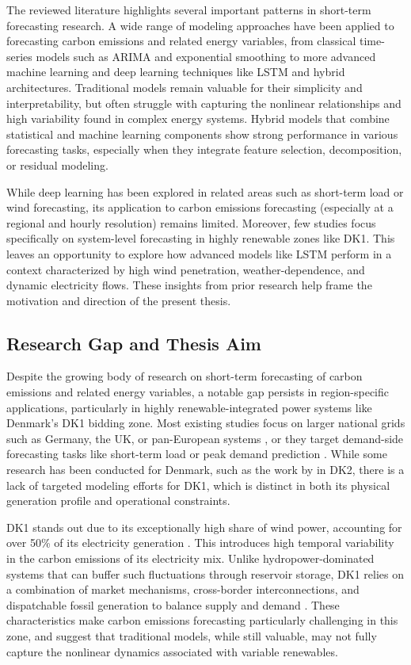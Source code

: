 The reviewed literature highlights several important patterns in short-term forecasting research. A wide range of modeling approaches have been applied to forecasting carbon emissions and related energy variables, from classical time-series models such as ARIMA and exponential smoothing to more advanced machine learning and deep learning techniques like LSTM and hybrid architectures. Traditional models remain valuable for their simplicity and interpretability, but often struggle with capturing the nonlinear relationships and high variability found in complex energy systems. Hybrid models that combine statistical and machine learning components show strong performance in various forecasting tasks, especially when they integrate feature selection, decomposition, or residual modeling.

While deep learning has been explored in related areas such as short-term load or wind forecasting, its application to carbon emissions forecasting (especially at a regional and hourly resolution) remains limited. Moreover, few studies focus specifically on system-level forecasting in highly renewable zones like DK1. This leaves an opportunity to explore how advanced models like LSTM perform in a context characterized by high wind penetration, weather-dependence, and dynamic electricity flows. These insights from prior research help frame the motivation and direction of the present thesis.

\subsection{Research Gap and Thesis Aim}

Despite the growing body of research on short-term forecasting of carbon emissions and related energy variables, a notable gap persists in region-specific applications, particularly in highly renewable-integrated power systems like Denmark's DK1 bidding zone. Most existing studies focus on larger national grids such as Germany, the UK, or pan-European systems \parencite{ostermann2024, bokde2021}, or they target demand-side forecasting tasks like short-term load or peak demand prediction \parencite{pierre2023, zhang2024}. While some research has been conducted for Denmark, such as the work by \textcite{leerbeck2020} in DK2, there is a lack of targeted modeling efforts for DK1, which is distinct in both its physical generation profile and operational constraints.

DK1 stands out due to its exceptionally high share of wind power, accounting for over 50\% of its electricity generation \parencite{wang2017,iea2023}. This introduces high temporal variability in the carbon emissions of its electricity mix. Unlike hydropower-dominated systems that can buffer such fluctuations through reservoir storage, DK1 relies on a combination of market mechanisms, cross-border interconnections, and dispatchable fossil generation to balance supply and demand \parencite{energistyrelsen}. These characteristics make carbon emissions forecasting particularly challenging in this zone, and suggest that traditional models, while still valuable, may not fully capture the nonlinear dynamics associated with variable renewables.

